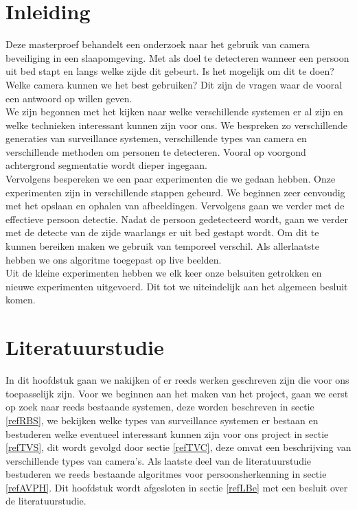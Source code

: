 \chapter{Inleiding}
Deze masterproef behandelt een onderzoek naar het gebruik van camera beveiliging in een slaapomgeving. Met als doel te detecteren wanneer een persoon uit bed stapt en langs welke zijde dit gebeurt. Is het mogelijk om dit te doen? Welke camera kunnen we het best gebruiken? Dit zijn de vragen waar de vooral een antwoord op willen geven. \\
We zijn begonnen met het kijken naar welke verschillende systemen er al zijn en welke technieken interessant kunnen zijn voor ons. We bespreken zo verschillende generaties van surveillance systemen, verschillende types van camera en verschillende methoden om personen te detecteren. Vooral op voorgond achtergrond segmentatie wordt dieper ingegaan. \\
Vervolgens bespereken we een paar experimenten die we gedaan hebben. Onze experimenten zijn in verschillende stappen gebeurd. We beginnen zeer eenvoudig met het opslaan en ophalen van afbeeldingen. Vervolgens gaan we verder met de effectieve persoon detectie. Nadat de persoon gedetecteerd wordt, gaan we verder met de detecte van de zijde waarlangs er uit bed gestapt wordt. Om dit te kunnen bereiken maken we gebruik van temporeel verschil. Als allerlaatste hebben we ons algoritme toegepast op live beelden. \\
Uit de kleine experimenten hebben we elk keer onze belsuiten getrokken en nieuwe experimenten uitgevoerd. Dit tot we uiteindelijk aan het algemeen besluit komen. 

\chapter{Literatuurstudie}
In dit hoofdstuk gaan we nakijken of er reeds werken geschreven zijn die voor ons toepasselijk zijn. Voor we beginnen aan het maken van het project, gaan we eerst op zoek naar reeds bestaande systemen, deze worden beschreven in sectie \ref{refRBS}, we bekijken welke types van surveillance systemen er bestaan en bestuderen welke eventueel interessant kunnen zijn voor ons project in sectie \ref{refTVS}, dit wordt gevolgd door sectie \ref{refTVC}, deze omvat  een beschrijving van verschillende types van camera's. Als laatste deel van de literatuurstudie bestuderen we reeds bestaande algoritmes voor persoonsherkenning in sectie \ref{refAVPH}. Dit hoofdstuk wordt afgesloten in sectie \ref{refLBe} met een besluit over de literatuurstudie.

